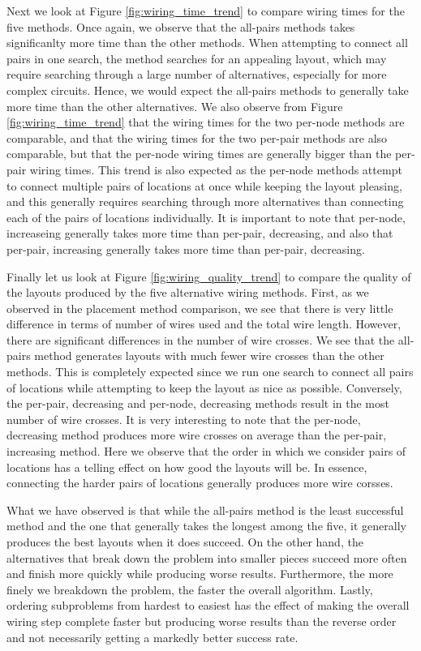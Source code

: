Next we look at Figure \ref{fig:wiring_time_trend} to compare wiring times for
the five methods. Once again, we observe that the all-pairs methods takes
significanlty more time than the other methods. When attempting to connect all
pairs in one search, the method searches for an appealing layout, which may
require searching through a large number of alternatives, especially for more
complex circuits. Hence, we would expect the all-pairs methods to generally take
more time than the other alternatives. We also observe from Figure
\ref{fig:wiring_time_trend} that the wiring times for the two per-node methods
are comparable, and that the wiring times for the two per-pair methods are also
comparable, but that the per-node wiring times are generally bigger than the
per-pair wiring times. This trend is also expected as the per-node methods
attempt to connect multiple pairs of locations at once while keeping the layout
pleasing, and this generally requires searching through more alternatives than
connecting each of the pairs of locations individually. It is important to note
that per-node, increaseing generally takes more time than per-pair, decreasing,
and also that per-pair, increasing generally takes more time than per-pair,
decreasing.

Finally let us look at Figure \ref{fig:wiring_quality_trend} to compare the
quality of the layouts produced by the five alternative wiring methods. First,
as we observed in the placement method comparison, we see that there is very
little difference in terms of number of wires used and the total wire length.
However, there are significant differences in the number of wire crosses. We see
that the all-pairs method generates layouts with much fewer wire crosses than
the other methods. This is completely expected since we run one search to
connect all pairs of locations while attempting to keep the layout as nice as
possible. Conversely, the per-pair, decreasing and per-node, decreasing methods
result in the most number of wire crosses. It is very interesting to note that
the per-node, decreasing method produces more wire crosses on average than the
per-pair,
increasing method. Here we observe that the order in which we consider pairs of
locations has a telling effect on how good the layouts will be. In essence,
connecting the harder pairs of locations generally produces more wire corsses.

What we have observed is that while the all-pairs method is the least successful
method and the one that generally takes the longest among the five,
it generally produces the best layouts when it does succeed. On the other hand,
the alternatives that break down the problem into smaller pieces succeed more
often and finish more quickly while producing worse results. Furthermore,
the more finely we breakdown the problem, the faster the overall algorithm.
Lastly, ordering subproblems from hardest to easiest has the effect of making the
overall wiring step complete faster but producing worse results than the reverse
order and not necessarily getting a markedly better success rate.


